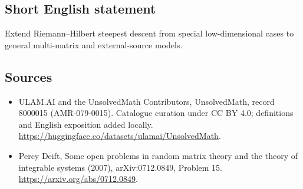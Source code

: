 \documentclass[11pt]{article}
\begin{document}
\subsection{Short English statement}
Extend Riemann--Hilbert steepest descent from special low-dimensional cases to general multi-matrix and external-source models.
\subsection{Sources}
\begin{itemize}
\item[\hypertarget{source:8000015:1}{S1}] ULAM.AI and the UnsolvedMath Contributors, UnsolvedMath, record 8000015 (AMR-079-0015). Catalogue curation under CC BY 4.0; definitions and English exposition added locally.
\url{https://huggingface.co/datasets/ulamai/UnsolvedMath}.
\item[\hypertarget{source:8000015:2}{S2}] Percy Deift, Some open problems in random matrix theory and the theory of integrable systems (2007), arXiv:0712.0849, Problem 15.
\url{https://arxiv.org/abs/0712.0849}.
\end{itemize}
\label{end:8000015}
\end{document}
